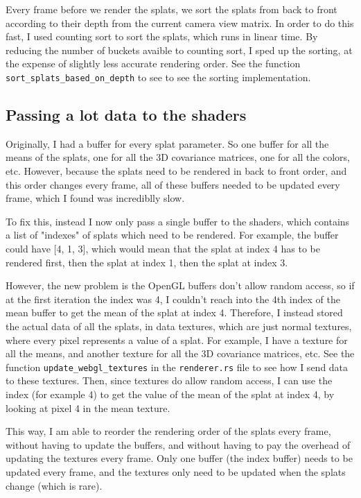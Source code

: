 \documentclass {article}
\begin{document}
     Every frame before we render the splats, we sort the splats from back to front according to their depth from the current camera view matrix. In order to do this fast, I used counting sort to sort the splats, which runs in linear time. By reducing the number of buckets avaible to counting sort, I sped up the sorting, at the expense of slightly less accurate rendering order. See the function \lstinline[style=inlinecode]{sort_splats_based_on_depth} to see to see the sorting implementation.

     \subsection{Passing a lot data to the shaders}

     Originally, I had a buffer for every splat parameter. So one buffer for all the means of the splats, one for all the 3D covariance matrices, one for all the colors, etc. However, because the splats need to be rendered in back to front order, and this order changes every frame, all of these buffers needed to be updated every frame, which I found was incrediblly slow.
     
     To fix this, instead I now only pass a single buffer to the shaders, which contains a list of "indexes" of splats which need to be rendered. For example, the buffer could have [4, 1, 3], which would mean that the splat at index 4 has to be rendered first, then the splat at index 1, then the splat at index 3. 

     However, the new problem is the OpenGL buffers don't allow random access, so if at the first iteration the index was 4, I couldn't reach into the 4th index of the mean buffer to get the mean of the splat at index 4. Therefore, I instead stored the actual data of all the splats, in data textures, which are just normal textures, where every pixel represents a value of a splat. For example, I have a texture for all the means, and another texture for all the 3D covariance matrices, etc. See the function \lstinline[style=inlinecode]{update_webgl_textures} in the \lstinline[style=inlinecode]{renderer.rs} file to see how I send data to these textures. Then, since textures do allow random access, I can use the index (for example 4) to get the value of the mean of the splat at index 4, by looking at pixel 4 in the mean texture. 

     This way, I am able to reorder the rendering order of the splats every frame, without having to update the buffers, and without having to pay the overhead of updating the textures every frame. Only one buffer (the index buffer) needs to be updated every frame, and the textures only need to be updated when the splats change (which is rare).
\end{document}
